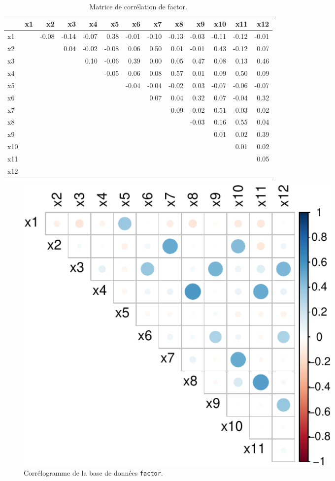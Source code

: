 \documentclass[
  11pt,
  letterpaper,
]{scrbook}
\theoremstyle{definition}
\theoremstyle{remark}
\begin{document}
\hypertarget{tbl-corrmat}{}
\begin{table}
\caption{\label{tbl-corrmat}Matrice de corrélation de factor. }\tabularnewline

\centering
\begin{tabular}{lrrrrrrrrrrrr}
\toprule
  & x1 & x2 & x3 & x4 & x5 & x6 & x7 & x8 & x9 & x10 & x11 & x12\\
\midrule
x1 &  & -0.08 & -0.14 & -0.07 & 0.38 & -0.01 & -0.10 & -0.13 & -0.03 & -0.11 & -0.12 & -0.01\\
x2 &  &  & 0.04 & -0.02 & -0.08 & 0.06 & 0.50 & 0.01 & -0.01 & 0.43 & -0.12 & 0.07\\
x3 &  &  &  & 0.10 & -0.06 & 0.39 & 0.00 & 0.05 & 0.47 & 0.08 & 0.13 & 0.46\\
x4 &  &  &  &  & -0.05 & 0.06 & 0.08 & 0.57 & 0.01 & 0.09 & 0.50 & 0.09\\
x5 &  &  &  &  &  & -0.04 & -0.04 & -0.02 & 0.03 & -0.07 & -0.06 & -0.07\\
\addlinespace
x6 &  &  &  &  &  &  & 0.07 & 0.04 & 0.32 & 0.07 & -0.04 & 0.32\\
x7 &  &  &  &  &  &  &  & 0.09 & -0.02 & 0.51 & -0.03 & 0.02\\
x8 &  &  &  &  &  &  &  &  & -0.03 & 0.16 & 0.55 & 0.04\\
x9 &  &  &  &  &  &  &  &  &  & 0.01 & 0.02 & 0.39\\
x10 &  &  &  &  &  &  &  &  &  &  & 0.01 & 0.02\\
\addlinespace
x11 &  &  &  &  &  &  &  &  &  &  &  & 0.05\\
x12 &  &  &  &  &  &  &  &  &  &  &  & \\
\bottomrule
\end{tabular}
\end{table}

\begin{figure}[ht!]

{\centering \includegraphics[width=0.8\textwidth,height=\textheight]{./02-analysefactorielle_files/figure-pdf/fig-corrmat-1.pdf}

}

\caption{\label{fig-corrmat}Corrélogramme de la base de données
\texttt{factor}.}

\end{figure}
\end{document}

